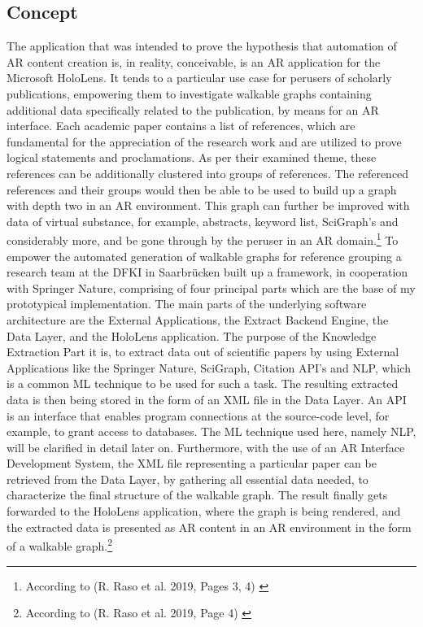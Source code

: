 \documentclass[12pt,a4paper,oneside,american,parskip=half]{article}
\begin{document}
\begin{justify}
\begin{normalsize}
\subsection{Concept}
The application that was intended to prove the hypothesis that automation of AR content creation is, in reality, conceivable, is an AR application for the Microsoft HoloLens. It tends to a particular use case for perusers of scholarly publications, empowering them to investigate walkable graphs containing additional data specifically related to the publication, by means for an AR interface.
\newline
Each academic paper contains a list of references, which are fundamental for the appreciation of the research work and are utilized to prove logical statements and proclamations. As per their examined theme, these references can be additionally clustered into groups of references. The referenced references and their groups would then be able to be used to build up a graph with depth two in an AR environment. This graph can further be improved with data of virtual substance, for example, abstracts, keyword list, SciGraph's and considerably more, and be gone through by the peruser in an AR domain.\footnote{According to (R. Raso et al. 2019, Pages 3, 4) \cite{walkable}}
\newline
To empower the automated generation of walkable graphs for reference grouping a research team at the DFKI in Saarbrücken built up a framework,
in cooperation with Springer Nature, comprising of four principal parts which are the base of my prototypical implementation.
\newline
The main parts of the underlying software architecture are the External Applications, the Extract Backend Engine, the Data Layer, and the HoloLens application. The purpose of the Knowledge Extraction Part it is, to extract data out of scientific papers by using External Applications like the Springer Nature, SciGraph, Citation \ac{API}'s and \ac{NLP}, which is a common \ac{ML} technique to be used for such a task. 
The resulting extracted data is then being stored in the form of an XML file in the Data Layer.
An API is an interface that enables program connections at the source-code level, for example, to grant access to databases. The ML technique used here, namely NLP, will be clarified in detail later on.
\newline
Furthermore, with the use of an AR Interface Development System, the XML file representing a particular paper can be retrieved from the Data Layer, by gathering all essential data needed, to characterize the final structure of the walkable graph. The result finally gets forwarded to the HoloLens application, where the graph is being rendered, and the extracted data is presented as AR content in an AR environment in the form of a walkable graph.\footnote{According to (R. Raso et al. 2019, Page 4) \cite{walkable}}

\end{normalsize}
\end{justify}
\end{document}

